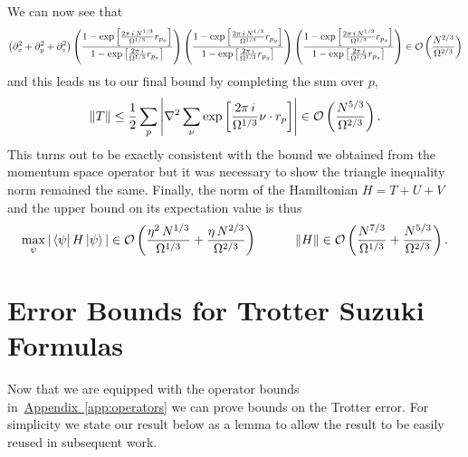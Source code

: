 \documentclass[superscriptaddress,aps,pra,nofootinbib,notitlepage,10pt,longbibliography]{revtex4-1}
\DeclareRobustCommand{\app}[1]{\hyperref[app:#1]{Appendix~\ref*{app:#1}}}
\def\bra#1{\mathinner{\langle{#1}|}}
\def\ket#1{\mathinner{|{#1}\rangle}}
\begin{document}
We can now see that
\begin{align}
\left(\partial^2_x + \partial^2_y + \partial^2_z\right)\left(\frac{1- \exp\left[\frac{2\pi \, i \, N^{1/3}}{\Omega^{1/3}} r_{p_x}\right]}{1 - \exp\left[\frac{2\pi \, i}{\Omega^{1/3}} r_{p_x}\right]}\right)
\left(\frac{1- \exp\left[\frac{2\pi \, i \, N^{1/3}}{\Omega^{1/3}} r_{p_y}\right]}{1 - \exp\left[\frac{2\pi \, i}{\Omega^{1/3}} r_{p_y}\right]}\right)
\left(\frac{1- \exp\left[\frac{2\pi \, i \, N^{1/3}}{\Omega^{1/3}} r_{p_z}\right]}{1 - \exp\left[\frac{2\pi \, i}{\Omega^{1/3}} r_{p_z}\right]}\right)
%
\in {\cal O}\left(\frac{N^{2/3}}{\Omega^{2/3}}\right)
\end{align}
and this leads us to our final bound by completing the sum over $p$,
\begin{equation}
\left \| T \right \| 
%
\leq \frac{1}{2} \sum_{p} \left |\nabla^2  \sum_\nu \exp\left[\frac{2\pi \, i}{\Omega^{1/3}} \nu \cdot r_p\right] \right |
%
\in {\cal O}\left(\frac{N^{5/3}}{\Omega^{2/3}}\right).
\end{equation}
This turns out to be exactly consistent with the bound we obtained from the momentum space operator but it was necessary to show the triangle inequality norm remained the same. Finally, the norm of the Hamiltonian $H = T + U + V $ and the upper bound on its expectation value is thus
\begin{equation}
\label{eq:h_bound}
\max_{\psi} | \bra{\psi} H\ket{\psi}| \in {\cal O}\left(\frac{\eta^2 \, N^{1/3}}{\Omega^{1/3}} + \frac{\eta \, N^{2/3}}{\Omega^{2/3}}\right)
%
\quad \quad \quad
\left \| H \right \| \in {\cal O}\left(\frac{N^{7/3}}{\Omega^{1/3}} + \frac{N^{5/3}}{\Omega^{2/3}}\right).
\end{equation}

\section{Error Bounds for Trotter Suzuki Formulas}
\label{app:TSerror}
Now that we are equipped with the operator bounds in~\app{operators} we can prove bounds on the Trotter error.  For simplicity we state our result below as a lemma to allow the result to be easily reused in subsequent work.
\end{document}
